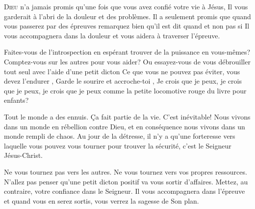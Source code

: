 


\lettrine{D}{ieu} n'a jamais promis qu'une fois que vous avez confié
 votre vie à Jésus, Il vous garderait à l'abri de la douleur et des problèmes.
 Il a seulement promis que quand vous passerez par des épreuves
 \ocadr remarquez bien qu'il est dit \Og quand \Fg{} et non pas \Og si \Fg{} \fcadr
 Il vous accompagnera dans la douleur et vous aidera à traverser l'épreuve. 


Faites-vous de l'introspection en espérant trouver de la puissance
 en vous-mêmes? Comptez-vous sur les autres pour vous aider?
 Ou essayez-vous de vous débrouiller tout seul avec l'aide d'une petit dicton\frcolon{}
 \Og Ce que vous ne pouvez pas éviter, vous devez l'endurer \Fg{},
 \Og Garde le sourire et accroche-toi \Fg{},
 \Og Je crois que je peux, je crois que je peux, je crois que je peux \Fg{}
 comme la petite locomotive rouge du livre pour enfants? 

Tout le monde a des ennuis. Ça fait partie de la vie. C'est inévitable!
 Nous vivons dans un monde en rébellion contre Dieu, et en conséquence
 nous vivons dans un monde rempli de chaos. Au jour de la détresse,
 il n'y a qu'une forteresse vers laquelle vous pouvez vous tourner
 pour trouver la sécurité, c'est le Seigneur Jésus-Christ. 

Ne vous tournez pas vers les autres. Ne vous tournez vers vos propres
 ressources. N'allez pas penser qu'une petit dicton positif va vous sortir
 d'affaires. Mettez, au contraire, votre confiance dans le Seigneur.
 Il vous accompagnera dans l'épreuve et quand vous en serez sortis,
 vous verrez la sagesse de Son plan. 

\dvrule






